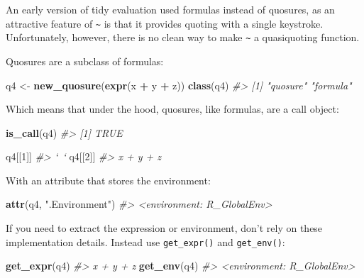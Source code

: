 \documentclass[]{book}
\newenvironment{Shaded}{\begin{snugshade}}{\end{snugshade}}
\newcommand{\CommentTok}[1]{\textcolor[rgb]{0.37,0.37,0.37}{\textit{#1}}}
\newcommand{\DecValTok}[1]{\textcolor[rgb]{0.06,0.06,0.06}{#1}}
\newcommand{\KeywordTok}[1]{\textcolor[rgb]{0.27,0.27,0.27}{\textbf{#1}}}
\newcommand{\NormalTok}[1]{#1}
\newcommand{\OperatorTok}[1]{\textcolor[rgb]{0.43,0.43,0.43}{\textbf{#1}}}
\newcommand{\StringTok}[1]{\textcolor[rgb]{0.5,0.5,0.5}{#1}}
\begin{document}
An early version of tidy evaluation used formulas instead of quosures, as an attractive feature of \texttt{\textasciitilde{}} is that it provides quoting with a single keystroke. Unfortunately, however, there is no clean way to make \texttt{\textasciitilde{}} a quasiquoting function.

Quosures are a subclass of formulas:

\begin{Shaded}
\begin{Highlighting}[]
\NormalTok{q4 <-}\StringTok{ }\KeywordTok{new_quosure}\NormalTok{(}\KeywordTok{expr}\NormalTok{(x }\OperatorTok{+}\StringTok{ }\NormalTok{y }\OperatorTok{+}\StringTok{ }\NormalTok{z))}
\KeywordTok{class}\NormalTok{(q4)}
\CommentTok{#> [1] "quosure" "formula"}
\end{Highlighting}
\end{Shaded}

Which means that under the hood, quosures, like formulas, are a call object:

\begin{Shaded}
\begin{Highlighting}[]
\KeywordTok{is_call}\NormalTok{(q4)}
\CommentTok{#> [1] TRUE}

\NormalTok{q4[[}\DecValTok{1}\NormalTok{]]}
\CommentTok{#> `~`}
\NormalTok{q4[[}\DecValTok{2}\NormalTok{]]}
\CommentTok{#> x + y + z}
\end{Highlighting}
\end{Shaded}

With an attribute that stores the environment:

\begin{Shaded}
\begin{Highlighting}[]
\KeywordTok{attr}\NormalTok{(q4, }\StringTok{".Environment"}\NormalTok{)}
\CommentTok{#> <environment: R_GlobalEnv>}
\end{Highlighting}
\end{Shaded}

If you need to extract the expression or environment, don't rely on these implementation details. Instead use \texttt{get\_expr()} and \texttt{get\_env()}:

\begin{Shaded}
\begin{Highlighting}[]
\KeywordTok{get_expr}\NormalTok{(q4)}
\CommentTok{#> x + y + z}
\KeywordTok{get_env}\NormalTok{(q4)}
\CommentTok{#> <environment: R_GlobalEnv>}
\end{Highlighting}
\end{Shaded}
\end{document}
